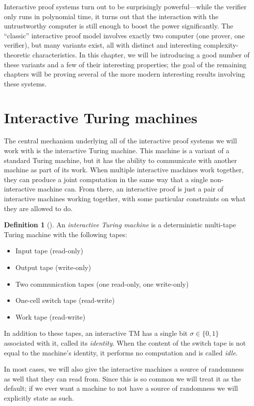 \documentclass[english,12pt]{reedthesis}
\theoremstyle{plain}
\theoremstyle{definition}
\newtheorem{defn}[defn]{Definition}
\theoremstyle{remark}
\begin{document}
Interactive proof systems turn out to be surprisingly powerful---while the
verifier only runs in polynomial time, it turns out that the interaction with
the untrustworthy computer is still enough to boost the power significantly.
The ``classic'' interactive proof model involves exactly two computer (one
prover, one verifier), but many variants exist, all with distinct and
interesting complexity-theoretic characteristics. In this chapter, we will be
introducing a good number of these variants and a few of their interesting
properties; the goal of the remaining chapters will be proving several of the
more modern interesting results involving these systems.

\section{Interactive Turing machines}\label{sec:interactive-tm}

The central mechanism underlying all of the interactive proof systems we will
work with is the interactive Turing machine. This machine is a variant of a
standard Turing machine, but it has the ability to communicate with another
machine as part of its work. When multiple interactive machines work together,
they can produce a joint computation in the same way that a single
non-interactive machine can. From there, an interactive proof is just a pair of
interactive machines working together, with some particular constraints on what
they are allowed to do.

\begin{defn}[{\cite[Def.\ 4.2.1]{Go01}}]\label{def:interactive-tm}
  An \emph{interactive Turing machine} is a deterministic multi-tape Turing
  machine with the following tapes:
  \begin{itemize}
    \item Input tape (read-only)
    \item Output tape (write-only)
    \item Two communication tapes (one read-only, one write-only)
    \item One-cell switch tape (read-write)
    \item Work tape (read-write)
  \end{itemize}
  In addition to these tapes, an interactive TM has a single bit $\sigma \in \{0, 1\}$
  associated with it, called its \emph{identity}.
  When the content of the switch tape is not equal to the machine's identity, it
  performs no computation and is called \emph{idle}.

  In most cases, we will also give the interactive machines a source of
  randomness as well that they can read from. Since this is so common we will
  treat it as the default; if we ever want a machine to not have a source of
  randomness we will explicitly state as such.
\end{defn}
\end{document}
